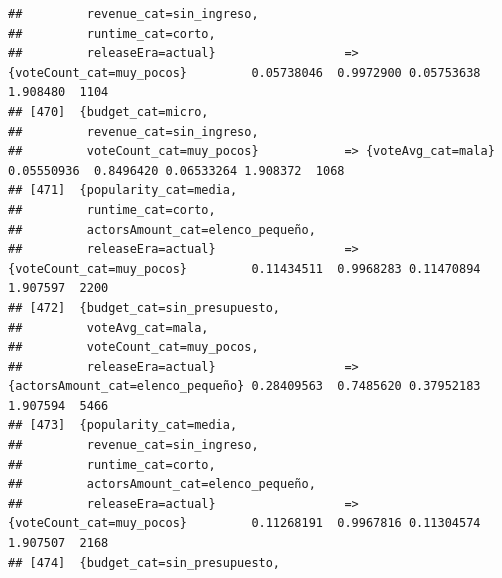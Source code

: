 \documentclass[
]{article}
\begin{document}
\begin{verbatim}
##         revenue_cat=sin_ingreso,                                                                                                
##         runtime_cat=corto,                                                                                                      
##         releaseEra=actual}                  => {voteCount_cat=muy_pocos}         0.05738046  0.9972900 0.05753638 1.908480  1104
## [470]  {budget_cat=micro,                                                                                                       
##         revenue_cat=sin_ingreso,                                                                                                
##         voteCount_cat=muy_pocos}            => {voteAvg_cat=mala}                0.05550936  0.8496420 0.06533264 1.908372  1068
## [471]  {popularity_cat=media,                                                                                                   
##         runtime_cat=corto,                                                                                                      
##         actorsAmount_cat=elenco_pequeño,                                                                                        
##         releaseEra=actual}                  => {voteCount_cat=muy_pocos}         0.11434511  0.9968283 0.11470894 1.907597  2200
## [472]  {budget_cat=sin_presupuesto,                                                                                             
##         voteAvg_cat=mala,                                                                                                       
##         voteCount_cat=muy_pocos,                                                                                                
##         releaseEra=actual}                  => {actorsAmount_cat=elenco_pequeño} 0.28409563  0.7485620 0.37952183 1.907594  5466
## [473]  {popularity_cat=media,                                                                                                   
##         revenue_cat=sin_ingreso,                                                                                                
##         runtime_cat=corto,                                                                                                      
##         actorsAmount_cat=elenco_pequeño,                                                                                        
##         releaseEra=actual}                  => {voteCount_cat=muy_pocos}         0.11268191  0.9967816 0.11304574 1.907507  2168
## [474]  {budget_cat=sin_presupuesto,                                                                                             

\end{verbatim}
\end{document}
